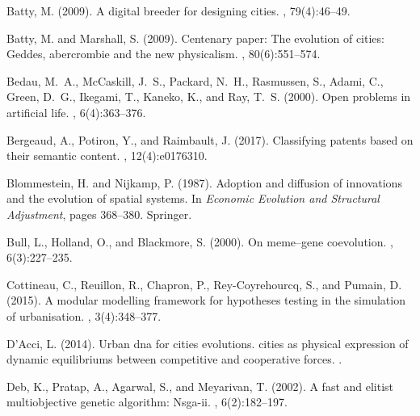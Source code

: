 \documentclass[letterpaper]{article}
\begin{document}
\begin{thebibliography}{}

Batty, M. (2009).
\newblock A digital breeder for designing cities.
, 79(4):46--49.

Batty, M. and Marshall, S. (2009).
\newblock Centenary paper: The evolution of cities: Geddes, abercrombie and the
  new physicalism.
, 80(6):551--574.

Bedau, M.~A., McCaskill, J.~S., Packard, N.~H., Rasmussen, S., Adami, C.,
  Green, D.~G., Ikegami, T., Kaneko, K., and Ray, T.~S. (2000).
\newblock Open problems in artificial life.
, 6(4):363--376.

Bergeaud, A., Potiron, Y., and Raimbault, J. (2017).
\newblock Classifying patents based on their semantic content.
, 12(4):e0176310.

Blommestein, H. and Nijkamp, P. (1987).
\newblock Adoption and diffusion of innovations and the evolution of spatial
  systems.
\newblock In {\em Economic Evolution and Structural Adjustment}, pages
  368--380. Springer.

Bull, L., Holland, O., and Blackmore, S. (2000).
\newblock On meme--gene coevolution.
, 6(3):227--235.

Cottineau, C., Reuillon, R., Chapron, P., Rey-Coyrehourcq, S., and Pumain, D.
  (2015).
\newblock A modular modelling framework for hypotheses testing in the
  simulation of urbanisation.
, 3(4):348--377.

D'Acci, L. (2014).
\newblock Urban dna for cities evolutions. cities as physical expression of
  dynamic equilibriums between competitive and cooperative forces.
.

Deb, K., Pratap, A., Agarwal, S., and Meyarivan, T. (2002).
\newblock A fast and elitist multiobjective genetic algorithm: Nsga-ii.
, 6(2):182--197.


\end{thebibliography}
\end{document}
